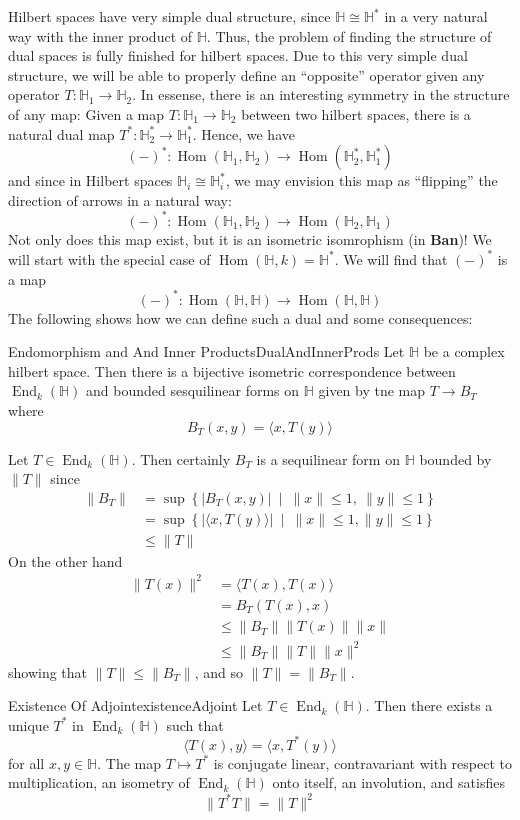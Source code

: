 \documentclass[oneside]{book}
\renewcommand{\H}{\mathbb{H}}
\renewcommand{\bf}[1]{\textbf{#1}}
\newcommand{\Hom}{\operatorname{Hom}}
\newcommand{\End}{\operatorname{End}}
\newcommand{\set}[2]{\left\{#1 \ \middle|\ #2\right\}}
\begin{document}
Hilbert spaces have very simple dual structure, since $\H \cong \H^*$ in a very natural way with the inner product of
$\H$. Thus, the problem of finding the structure of dual spaces is fully finished for hilbert spaces. Due to this very
simple dual structure, we will be able to properly define an ``opposite'' operator given any operator $T: \H_1 \to
\H_2$. In essense, there is an interesting symmetry in the structure of any map: Given a map $T: \H_1 \to \H_2$ between
two hilbert spaces, there is a natural dual map $T^*: \H_{2}^* \to \H_1^*$. Hence, we have
\[
	(-)^*: \Hom(\H_1, \H_2) \to \Hom(\H_2^*, \H_1^*)
\]
and since in Hilbert spaces $\H_i\cong \H_i^*$, we may envision this map as ``flipping'' the direction of arrows in
a natural way:
\[
	(-)^*: \Hom(\H_1, \H_2) \to \Hom(\H_2, \H_1)
\]
Not only does this map exist, but it is an isometric isomrophism (in \bf{Ban})! We will start with the special case of
$\Hom(\H, k) = \H^*$. We will find that $(-)^*$ is a map
\[
	(-)^*: \Hom(\H, \H) \to \Hom(\H, \H)
\]
The following shows how we can define such a dual
and some consequences:

\begin{lem}{Endomorphism and And Inner Products}{DualAndInnerProds}
	Let $\H$ be a complex hilbert space. Then there is a bijective isometric correspondence between
	$\End_k(\H)$ and bounded sesquilinear forms on $\H$ given by tne map $T \to B_T$ where
	\[
		B_T(x,y) = \langle x, T(y)\rangle
	\]
\end{lem}

\begin{Proof}
	Let $T \in \End_k(\H)$. Then certainly $B_T$ is a sequilinear form on $\H$ bounded by $\|T\|$ since
	\begin{align*}
		\|B_T\| &= \sup\set{|B_T(x,y)|}{\|x\| \le 1,\ \|y\|\le 1}\\
				&= \sup\set{|\langle x, T(y)\rangle|}{\|x\|\le 1,\| y \| \le 1 }\\
				&\le \|T\|
	\end{align*}
	On the other hand
	\begin{align*}
		\|T(x)\|^2 &=  \langle T(x), T(x)\rangle\\
		&= B_T(T(x), x)\\
		&\le \|B_T\|\|T(x)\|\|x\|\\
		&\le \|B_T\|\|T\|\|x\|^2
	\end{align*}
	showing that $\|T\| \le \|B_T\|$, and so $\|T\| = \|B_T\|$.
\end{Proof}

\begin{thm}{Existence Of Adjoint}{existenceAdjoint}
	Let $T \in \End_k(\H)$. Then there exists a unique $T^*$ in $\End_k(\H)$ such that
	\[
		\langle T(x), y\rangle = \langle x, T^*(y)\rangle
	\]
	for all $x,y \in \H$. The map $T \mapsto T^*$ is conjugate linear, contravariant with respect to
	multiplication, an isometry of $\End_k(\H)$ onto itself, an involution, and satisfies
	\[
		\|T^*T\| = \|T\|^2
	\]
\end{thm}
\end{document}

